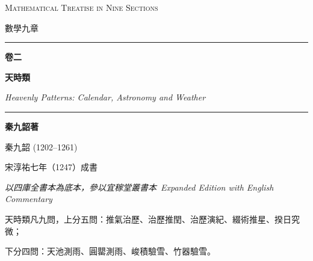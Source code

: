 \documentclass[11pt,a4paper]{article}
\newcommand{\longline}{\noindent\rule{\textwidth}{0.4pt}}
\begin{document}
\begin{titlepage}
\begin{center}
\vspace*{2cm}

{\fontsize{28}{34}\selectfont\color{titlecolor}
\textsc{Mathematical Treatise in Nine Sections}}

\vspace{0.8cm}

{\fontsize{18}{22}\selectfont\color{sectioncolor}
數學九章}

\vspace{1.5cm}

\longline

\vspace{1.5cm}

{\fontsize{36}{42}\selectfont\color{headcolor}
\textbf{卷二}}

\vspace{0.5cm}

{\fontsize{24}{30}\selectfont\color{sectioncolor}
\textbf{天時類}}

\vspace{0.3cm}

{\Large\textit{Heavenly Patterns: Calendar, Astronomy and Weather}}

\vspace{1.5cm}

\longline

\vspace{1.5cm}

{\Large\textbf{秦九韶著}}

\vspace{0.2cm}

{\large 秦九韶 (1202--1261)}

\vspace{0.5cm}

{\normalsize\color{notecolor} 宋淳祐七年（1247）成書}

\vspace{2cm}

{\small\color{sectioncolor}
\textit{以四庫全書本為底本，參以宜稼堂叢書本}\
\textit{Expanded Edition with English Commentary}}

\vfill

{\small 天時類凡九問，上分五問：推氣治歷、治歷推閏、治歷演紀、綴術推星、揆日究微；}

{\small 下分四問：天池測雨、圓罌測雨、峻積驗雪、竹器驗雪。}

\end{center}
\end{titlepage}
\end{document}
